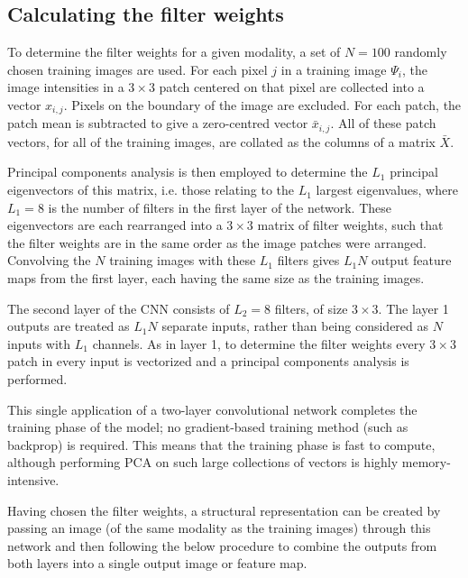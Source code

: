 \documentclass{report}
\begin{document}
\subsection{Calculating the filter weights}
To determine the filter weights for a given modality, a set of $N=100$ randomly chosen training images are used. For each pixel $j$ in a training image $\Psi_i$, the image intensities in a $3 \times 3$ patch centered on that pixel are collected into a vector $x_{i,j}$. Pixels on the boundary of the image are excluded. For each patch, the patch mean is subtracted to give a zero-centred vector $\bar{x}_{i,j}$. All of these patch vectors, for all of the training images, are collated as the columns of a matrix $\bar{X}$. 

Principal components analysis is then employed to determine the $L_1$ principal eigenvectors of this matrix, i.e. those relating to the $L_1$ largest eigenvalues, where $L_1=8$ is the number of filters in the first layer of the network. These eigenvectors are each rearranged into a $3 \times 3$ matrix of filter weights, such that the filter weights are in the same order as the image patches were arranged. Convolving the $N$ training images with these $L_1$ filters gives $L_1N$ output feature maps from the first layer, each having the same size as the training images.

The second layer of the CNN consists of $L_2=8$ filters, of size $3 \times 3$. The layer 1 outputs are treated as $L_1N$ separate inputs, rather than being considered as $N$ inputs with $L_1$ channels. As in layer 1, to determine the filter weights every $3 \times 3$ patch in every input is vectorized and a principal components analysis is performed. 

This single application of a two-layer convolutional network completes the training phase of the model; no gradient-based training method (such as backprop) is required. This means that the training phase is fast to compute, although performing PCA on such large collections of vectors is highly memory-intensive. 

Having chosen the filter weights, a structural representation can be created by passing an image (of the same modality as the training images) through this network and then following the below procedure to combine the outputs from both layers into a single output image or feature map.
\end{document}
